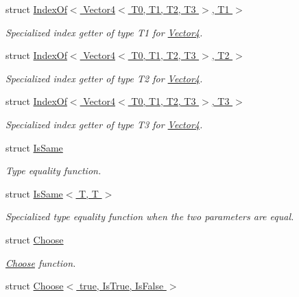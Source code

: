 \begin{DoxyCompactItemize}
struct \hyperlink{struct_d_o_1_1_meta_1_1_index_of_3_01_vector4_3_01_t0_00_01_t1_00_01_t2_00_01_t3_01_4_00_01_t1_01_4}{Index\-Of$<$ Vector4$<$ T0, T1, T2, T3 $>$, T1 $>$}
\begin{DoxyCompactList}\small\item\em Specialized index getter of type T1 for \hyperlink{struct_d_o_1_1_meta_1_1_vector4}{Vector4}. \end{DoxyCompactList}\item 
struct \hyperlink{struct_d_o_1_1_meta_1_1_index_of_3_01_vector4_3_01_t0_00_01_t1_00_01_t2_00_01_t3_01_4_00_01_t2_01_4}{Index\-Of$<$ Vector4$<$ T0, T1, T2, T3 $>$, T2 $>$}
\begin{DoxyCompactList}\small\item\em Specialized index getter of type T2 for \hyperlink{struct_d_o_1_1_meta_1_1_vector4}{Vector4}. \end{DoxyCompactList}\item 
struct \hyperlink{struct_d_o_1_1_meta_1_1_index_of_3_01_vector4_3_01_t0_00_01_t1_00_01_t2_00_01_t3_01_4_00_01_t3_01_4}{Index\-Of$<$ Vector4$<$ T0, T1, T2, T3 $>$, T3 $>$}
\begin{DoxyCompactList}\small\item\em Specialized index getter of type T3 for \hyperlink{struct_d_o_1_1_meta_1_1_vector4}{Vector4}. \end{DoxyCompactList}\item 
struct \hyperlink{struct_d_o_1_1_meta_1_1_is_same}{Is\-Same}
\begin{DoxyCompactList}\small\item\em Type equality function. \end{DoxyCompactList}\item 
struct \hyperlink{struct_d_o_1_1_meta_1_1_is_same_3_01_t_00_01_t_01_4}{Is\-Same$<$ T, T $>$}
\begin{DoxyCompactList}\small\item\em Specialized type equality function when the two parameters are equal. \end{DoxyCompactList}\item 
struct \hyperlink{struct_d_o_1_1_meta_1_1_choose}{Choose}
\begin{DoxyCompactList}\small\item\em \hyperlink{struct_d_o_1_1_meta_1_1_choose}{Choose} function. \end{DoxyCompactList}\item 
struct \hyperlink{struct_d_o_1_1_meta_1_1_choose_3_01true_00_01_is_true_00_01_is_false_01_4}{Choose$<$ true, Is\-True, Is\-False $>$}

\end{DoxyCompactItemize}
